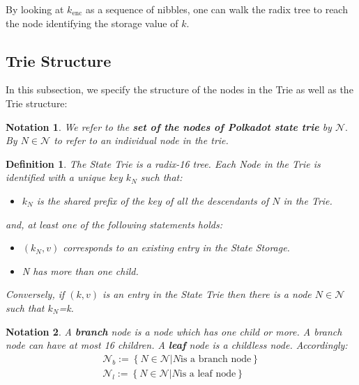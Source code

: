 \documentclass{book}
\newcommand{\assign}{:=}
\newcommand{\tmop}[1]{\ensuremath{\operatorname{#1}}}
\newcommand{\tmstrong}[1]{\textbf{#1}}
\newcommand{\tmtextbf}[1]{{\bfseries{#1}}}
\newcommand{\tmtexttt}[1]{{\ttfamily{#1}}}
\newcommand{\tmverbatim}[1]{{\ttfamily{#1}}}
\newenvironment{itemizeminus}{\begin{itemize} \renewcommand{\labelitemi}{$-$}\renewcommand{\labelitemii}{$-$}\renewcommand{\labelitemiii}{$-$}\renewcommand{\labelitemiv}{$-$}}{\end{itemize}}
\newtheorem{definition}{Definition}
\newtheorem{notation}{Notation}
\providecommand{\tmop}[1]{\ensuremath{\mathrm{#1}}}
\providecommand{\tmstrong}[1]{\tmtextbf{#1}}
\providecommand{\tmtextbf}[1]{\tmtextbf{#1}}
\providecommand{\tmverbatim}[1]{\tmtexttt{#1}}
\newtheorem{definition}{Definition}
\newtheorem{notation}{Notation}
\begin{document}
By looking at $k_{\tmop{enc}}$ as a sequence of nibbles, one can walk the
radix tree to reach the node identifying the storage value of $k$.

\subsection{Trie Structure}

In this subsection, we specify the structure of the nodes in the Trie as well
as the Trie structure:

\begin{notation}
  We refer to the {\tmstrong{set of the nodes of Polkadot state trie}} by
  $\mathcal{N}.$ By $N \in \mathcal{N}$ to refer to an individual node in the
  trie.
\end{notation}

\begin{definition}
  \label{defn-nodetype}The State Trie is a radix-16 tree. Each Node in the
  Trie is identified with a unique key $k_N$ such that:
  \begin{itemizeminus}
    \item $k_N$ is the shared prefix of the key of all the descendants of $N$
    in the Trie.
  \end{itemizeminus}
  and, at least one of the following statements holds:
  \begin{itemizeminus}
    \item $(k_N, v)$ corresponds to an existing entry in the State Storage.
    
    \item N has more than one child.
  \end{itemizeminus}
  \tmverbatim{}Conversely, if $(k, v)$ is an entry in the State Trie then
  there is a node $N \in \mathcal{N}$ such that $k_N$=k.
\end{definition}

\begin{notation}
  A {\tmstrong{branch}} node is a node which has one child or more. A branch
  node can have at most 16 children. A {\tmstrong{leaf}} node is a childless
  node. Accordingly:
  \[ \begin{array}{c}
       \mathcal{N}_b \assign \left\{ N \in \mathcal{N}|N \text{is a branch
       node} \right\}\\
       \mathcal{N}_l \assign \left\{ N \in \mathcal{N}|N \text{is a leaf node}
       \right\}
     \end{array} \]
\end{notation}
\end{document}

